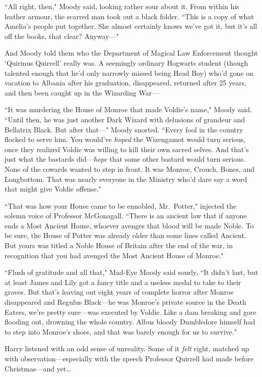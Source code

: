 ``All right, then," Moody said, looking rather sour about it. From within his leather armour, the scarred man took out a black folder. ``This is a copy of what Amelia's people put together. She almost certainly knows we've got it, but it's all off the books, that clear? Anyway—"

And Moody told them who the Department of Magical Law Enforcement thought `Quirinus Quirrell' really was. A seemingly ordinary Hogwarts student (though talented enough that he'd only narrowly missed being Head Boy) who'd gone on vacation to Albania after his graduation, disappeared, returned after 25 years, and then been caught up in the Wizarding War—

``It was murdering the House of Monroe that made Voldie's name," Moody said. ``Until then, he was just another Dark Wizard with delusions of grandeur and Bellatrix Black. But after that—" Moody snorted. ``Every fool in the country flocked to serve him. You would've \emph{hoped} the Wizengamot would turn serious, once they realized Voldie was willing to kill their own sacred selves. And that's just what the bastards did—\emph{hope} that some other bastard would turn serious. None of the cowards wanted to step in front. It was Monroe, Crouch, Bones, and Longbottom. That was nearly everyone in the Ministry who'd dare say a word that might give Voldie offense."

``That was how your House came to be ennobled, Mr.~Potter," injected the solemn voice of Professor McGonagall. ``There is an ancient law that if anyone ends a Most Ancient House, whoever avenges that blood will be made Noble. To be sure, the House of Potter was already older than some lines called Ancient. But yours was titled a Noble House of Britain after the end of the war, in recognition that you had avenged the Most Ancient House of Monroe."

``Flush of gratitude and all that," Mad-Eye Moody said sourly. ``It didn't last, but at least James and Lily got a fancy title and a useless medal to take to their graves. But that's leaving out eight years of complete horror after Monroe disappeared and Regulus Black—he was Monroe's private source in the Death Eaters, we're pretty sure—was executed by Voldie. Like a dam breaking and gore flooding out, drowning the whole country. Albus bloody Dumbledore himself had to step into Monroe's shoes, and that was barely enough for us to survive."

Harry listened with an odd sense of unreality. Some of it \emph{felt} right, matched up with observation—especially with the speech Professor Quirrell had made before Christmas—and yet{\ldots}

